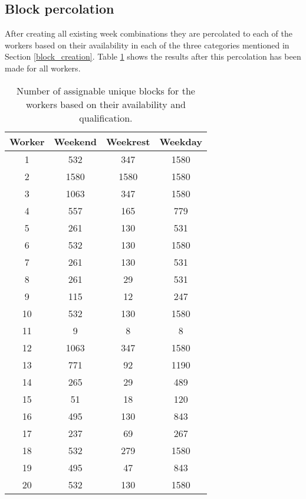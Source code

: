 \subsection{Block percolation}
After creating all existing week combinations they are percolated to each of the workers based on their availability in each of the three categories mentioned in Section \ref{block_creation}. Table \ref{blocks_available_per_worker} shows the results after this percolation has been made for all workers.

\begin{table}[!h]
\centering
\caption{Number of assignable unique blocks for the workers based on their availability and qualification.}
\label{blocks_available_per_worker}
\begin{tabular}{|c|ccc|}
\hline
Worker & Weekend & Weekrest & Weekday \\ \hline
1      & 532     & 347      & 1580    \\ \hline
2      & 1580    & 1580     & 1580    \\ \hline
3      & 1063    & 347      & 1580    \\ \hline
4      & 557     & 165      & 779     \\ \hline
5      & 261     & 130      & 531     \\ \hline
6      & 532     & 130      & 1580    \\ \hline
7      & 261     & 130      & 531     \\ \hline
8      & 261     & 29       & 531     \\ \hline
9      & 115     & 12       & 247     \\ \hline
10     & 532     & 130      & 1580    \\ \hline
11     & 9       & 8        & 8       \\ \hline
12     & 1063    & 347      & 1580    \\ \hline
13     & 771     & 92       & 1190    \\ \hline
14     & 265     & 29       & 489     \\ \hline
15     & 51      & 18       & 120     \\ \hline
16     & 495     & 130      & 843     \\ \hline
17     & 237     & 69       & 267     \\ \hline
18     & 532     & 279      & 1580    \\ \hline
19     & 495     & 47       & 843     \\ \hline
20     & 532     & 130      & 1580    \\ \hline

\end{tabular}
\end{table}
